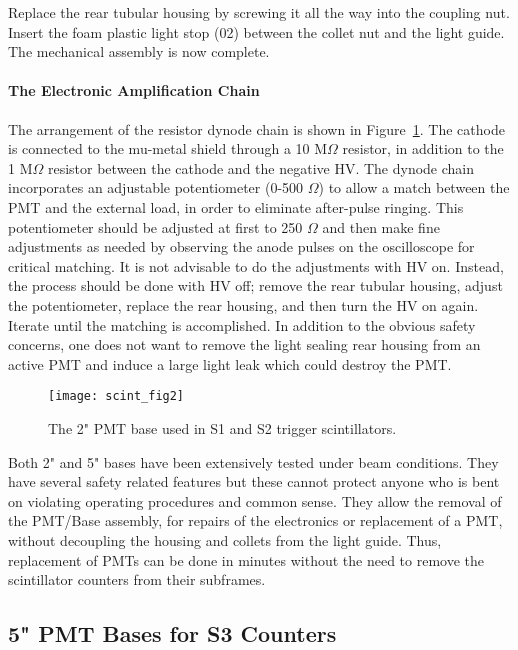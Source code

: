 Replace the rear tubular housing by screwing it all the way into the coupling 
nut. Insert the foam plastic light stop (02) between the collet nut and the 
light guide. The mechanical assembly is now complete. 


\paragraph{The Electronic Amplification Chain}

   The arrangement of the resistor dynode chain is shown in 
Figure~\ref{fig:scint_2}. The 
cathode is connected to the mu-metal shield through a 10 M$\Omega$ resistor, in
addition to the 1 M$\Omega$ resistor between the cathode and the negative HV. The
dynode chain incorporates an adjustable potentiometer (0-500 $\Omega$) to allow a
match between the PMT and the external load, in order to eliminate after-pulse
ringing.  This potentiometer should be adjusted at first to 250 $\Omega$ and then
make fine adjustments as needed by observing the anode pulses on the
oscilloscope for critical matching. It is not advisable to do the adjustments
with HV on. Instead, the process should be done with HV off; remove the rear
tubular housing, adjust the potentiometer, replace the rear housing, and then
turn the HV on again. Iterate until the matching is accomplished. In addition to the
obvious safety concerns, one does not want to remove the light sealing rear
housing from an active PMT and induce a large light leak which could destroy
the PMT. 

\begin{figure}[tbh]
\begin{center}
\texttt{[image: scint\_fig2]}
{\linespread{1.}
\caption[Detectors: 2'' PMT Base]{The 2" PMT base used in S1 and S2 trigger scintillators.}
\label{fig:scint_2}}
\end{center}
\end{figure}

   Both 2" and 5" bases have been extensively tested under beam conditions. 
They have several safety related features but these cannot protect anyone who 
is bent on violating operating procedures and common sense. They allow the 
removal of the PMT/Base assembly, for repairs of the electronics or replacement 
of a PMT, without decoupling the housing and collets from the light guide. 
Thus, replacement of PMTs can be done in minutes without the need to remove the 
scintillator counters from their subframes.


\subsection{ 5" PMT Bases for S3 Counters}


